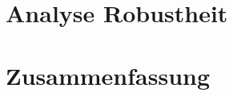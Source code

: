 \section{Analyse Robustheit}\label{sec:results:robustness}
\section{Zusammenfassung}\label{sec:results:summary}















